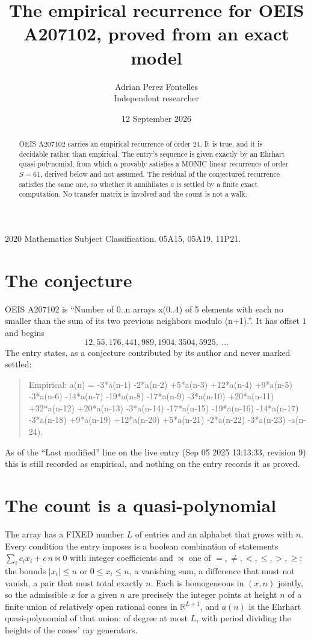 \documentclass[11pt,a4paper]{article}
\title{The empirical recurrence for OEIS A207102, proved from an exact model}
\author{Adrian Perez Fontelles\\ \small Independent researcher}
\date{12 September 2026}
\theoremstyle{plain}
\theoremstyle{definition}
\begin{document}
\maketitle

\begin{abstract}
OEIS A207102 carries an empirical recurrence of order $24$. It is true, and it is
decidable rather than empirical. The entry's sequence is given exactly by an Ehrhart quasi-polynomial, from
which $a$ provably satisfies a MONIC linear recurrence of order $S=61$, derived below and not
assumed. The residual of the conjectured recurrence satisfies the same one, so whether it
annihilates $a$ is settled by a finite exact computation. No transfer matrix is involved and
the count is not a walk.
\end{abstract}

\noindent\small 2020 Mathematics Subject Classification. 05A15, 05A19, 11P21.\normalsize

\section{The conjecture}

OEIS A207102 is ``Number of 0..n arrays x(0..4) of 5 elements with each no smaller than the sum of its two previous neighbors modulo (n+1).''. It has offset $1$ and begins
\[
12, 55, 176, 441, 989, 1904, 3504, 5925,\ \dots
\]
The entry states, as a conjecture contributed by its author and never marked settled:
\begin{quote}
Empirical: a(n) = -3*a(n-1) -2*a(n-2) +5*a(n-3) +12*a(n-4) +9*a(n-5) -3*a(n-6) -14*a(n-7) -19*a(n-8) -17*a(n-9) -3*a(n-10) +20*a(n-11) +32*a(n-12) +20*a(n-13) -3*a(n-14) -17*a(n-15) -19*a(n-16) -14*a(n-17) -3*a(n-18) +9*a(n-19) +12*a(n-20) +5*a(n-21) -2*a(n-22) -3*a(n-23) -a(n-24).
\end{quote}
As of the ``Last modified'' line on the live entry (Sep 05 2025 13:13:33, revision 9)
this is still recorded as empirical, and nothing on the entry records it as proved.

\section{The count is a quasi-polynomial}

The array has a FIXED number $L$ of entries and an alphabet that grows with $n$. Every
condition the entry imposes is a boolean combination of statements
$\sum_i c_ix_i + c\,n \bowtie 0$ with integer coefficients and $\bowtie$ one of
$=,\ne,<,\le,>,\ge$: the bounds $|x_i|\le n$ or $0\le x_i\le n$, a vanishing sum, a difference
that must not vanish, a pair that must total exactly $n$. Each is homogeneous in $(x,n)$
jointly, so the admissible $x$ for a given $n$ are precisely the integer points at height $n$
of a finite union of relatively open rational cones in $\mathbb{R}^{L+1}$, and $a(n)$ is
the Ehrhart quasi-polynomial of that union: of degree at most $L$, with period dividing the
heights of the cones' ray generators.
\end{document}
